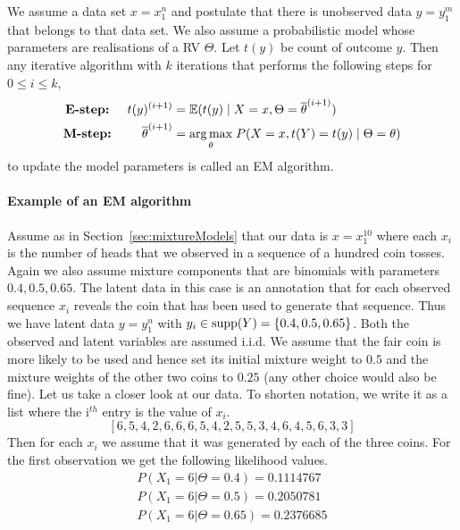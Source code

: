 \begin{Definition}[EM algorithm]\label{def:EM}
We assume a data set $ x = x_{1}^{n} $ and postulate that there is unobserved data $ y = y_{1}^{m} $ that belongs to that data set. We also
assume a probabilistic model whose parameters are realisations of a RV $ \Theta $. Let $ t(y) $ be count
of outcome $ y $. Then any iterative algorithm with $ k $ iterations that performs the following steps for $0\leq i \leq k$,
\begin{align*}
\mbox{\textbf{E-step:} } \quad t(y)^{(i+1)} &= \mathbb{E}(t(y) \mid X = x, \Theta = \overline{\theta}^{(i+1)}) \\
\mbox{\textbf{M-step:} } \qquad \overline{\theta}^{(i+1)} &= \underset{\theta}{\arg\max} \; P(X=x, t(Y) = t(y) \mid \Theta = \theta) 
\end{align*}
to update the model parameters is called an EM algorithm.
\end{Definition}

\paragraph{Example of an EM algorithm} Assume as in Section~\ref{sec:mixtureModels} that our data is $ x=x^{10}_{1} $ where each $ x_{i} $ is the 
number of heads that we observed in a sequence of a hundred coin tosses. Again we also assume mixture components that are binomials with parameters
$ 0.4, 0.5, 0.65 $. The latent data in this case is an annotation that for each observed sequence $ x_{i} $ reveals the coin that has been used
to generate that sequence. Thus we have latent data $ y=y_{1}^{n} $ with $ y_i \in \operatorname{supp}(Y) = \{0.4,0.5,0.65\} $. Both the observed and latent variables
are assumed i.i.d.
We assume that the fair coin is more likely to be used and hence set its initial mixture weight to $ 0.5 $ and the mixture weights of the 
other two coins to $ 0.25 $ (any other choice would also be fine). Let 
us take a closer look at our data. To shorten notation, we write it as a list where the i$ ^{th} $ entry is the value of $ x_{i} $.
$$ [6, 5, 4, 2, 6, 6, 6, 5, 4, 2, 5, 5, 3, 4, 6, 4, 5, 6, 3, 3 ] $$ 
Then for each $ x_{i} $ we assume that it was generated by each of the three coins. For the first observation we get the following likelihood values.
\begin{align}
&P(X_{1}=6|\Theta=0.4) = 0.1114767& \\
&P(X_{1}=6|\Theta=0.5) = 0.2050781& \nonumber \\ 
&P(X_{1}=6|\Theta=0.65) = 0.2376685& \nonumber
\end{align}

